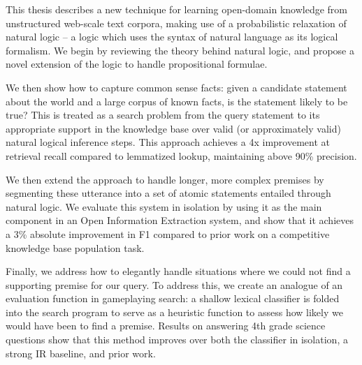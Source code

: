 This thesis describes a new technique for learning open-domain knowledge from unstructured web-scale text corpora,
  making use of a probabilistic relaxation of natural logic -- 
  a logic which uses the syntax of natural language as its logical formalism.
We begin by reviewing the theory behind natural logic, and propose a novel extension of the logic to handle
  propositional formulae.

We then show how to capture common sense facts: given a candidate statement about the world and a large corpus of 
  known facts, is the statement likely to be true? 
This is treated as a search problem 
  from the query statement to its appropriate support in the knowledge base over valid (or approximately valid) 
  natural logical inference steps.
This approach achieves a 4x improvement at retrieval recall compared to lemmatized lookup, 
  maintaining above 90\% precision.

We then extend the approach to handle longer, more complex premises by segmenting these utterance into a set of 
  atomic statements entailed through natural logic.
We evaluate this system in isolation by using it as the main component in an Open Information Extraction system, 
  and show that it achieves a 3\% absolute improvement in F1 compared to prior work on a competitive knowledge 
  base population task.

Finally, we address how to elegantly handle situations where we could not find a supporting premise for our query.
To address this, we create an analogue of an evaluation function in gameplaying search: a shallow lexical 
  classifier is folded into the search program to serve as a heuristic function to assess how likely we would 
  have been to find a premise.
Results on answering 4th grade science questions show that this method improves over both the classifier in isolation, 
  a strong IR baseline, and prior work.
